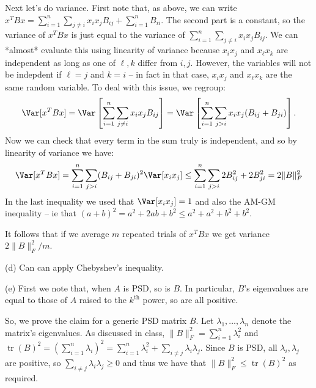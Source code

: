 \documentclass[11pt]{article}
\DeclareMathOperator{\tr}{tr}
\begin{document}
Next let's do variance. First note that, as above, we can write $x^TBx = \sum_{i=1}^n\sum_{j\neq i} x_ix_j B_{ij} + \sum_{i=1}^n B_{ii}$. The second part is a constant, so the variance of $x^TBx$ is just equal to the variance of $\sum_{i=1}^n\sum_{j\neq i} x_ix_j B_{ij} $. We can *almost* evaluate this using linearity of variance because $x_ix_j$ and $x_\ell x_k$ are independent as long as one of $\ell,k$ differ from $i,j$. However, the variables will not be indepdent if $\ell = j$ and $k=i$ -- in fact in that case, $x_ix_j$ and $x_\ell x_k$ are the same random variable. To deal with this issue, we regroup:
\begin{align*}
	\Var[x^TBx] = \Var\left[\sum_{i=1}^n\sum_{j\neq i} x_ix_j B_{ij} \right] = \Var\left[\sum_{i=1}^n\sum_{j> i} x_ix_j (B_{ij} + B_{ji}) \right].
\end{align*}
Now we can check that every term in the sum truly is independent, and so by linearity of variance we have:
\begin{align*}
	\Var[x^TBx] = \sum_{i=1}^n\sum_{j> i}(B_{ij} + B_{ji})^2 \Var[ x_ix_j ] \leq  \sum_{i=1}^n\sum_{j> i}2B_{ij}^2 + 2B_{ji}^2 = 2\|B\|_F^2
\end{align*}
In the last inequality we used that $\Var[ x_ix_j ]  = 1$ and also the AM-GM inequality -- ie that $(a+b)^2 = a^2 + 2ab + b^2 \leq a^2 + a^2 + b^2 + b^2$.  

It follows that if we average $m$ repeated trials of $x^TBx$ we get variance $2\|B\|_F^2/m$.

(d) Can can apply Chebyshev's inequality. 

(e) First we note that, when $A$ is PSD, so is $B$. In particular, $B$'s eigenvalues are equal to those of $A$ raised to the $k^\text{th}$ power, so are all positive.

So, we prove the claim for a generic PSD matrix $B$. Let $\lambda_1, \ldots, \lambda_n$ denote the matrix's eigenvalues.
 As discussed in class, $\|B\|_F^2 = \sum_{i=1}^n \lambda_i^2$ and $\tr(B)^2 = (\sum_{i=1}^n \lambda_i)^2 = \sum_{i=1}^n \lambda_i^2 + \sum_{i\neq j} \lambda_i \lambda_j$. Since $B$ is PSD, all $\lambda_i, \lambda_j$ are positive, so  $\sum_{i\neq j} \lambda_i \lambda_j \geq 0$ and thus we have that  $\|B\|_F^2 \leq \tr(B)^2$ as required. 
	
\end{document}
